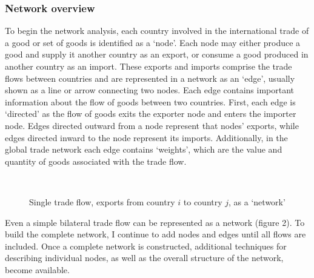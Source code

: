 \documentclass[10pt,letterpaper,pdftex]{article}
\begin{document}
\subsubsection{Network overview} \label{nw2}
To begin the network analysis, each country involved in the international trade of a good or set of goods is identified as a `node'. Each node may either produce a good and supply it another country as an export, or consume a good produced in another country as an import. These exports and imports comprise the trade flows between countries and are represented in a network as an `edge', usually shown as a line or arrow connecting two nodes. Each edge contains important information about the flow of goods between two countries. First, each edge is `directed' as the flow of goods exits the exporter node and enters the importer node. Edges directed outward from a node represent that nodes' exports, while edges directed inward to the node represent its imports. Additionally, in the global trade network each edge contains `weights', which are the value and quantity of goods associated with the trade flow.

\begin{figure}[!htb]\label{fig:nw_simple}
  \caption{Single trade flow, exports from country $i$ to country $j$, as a `network'}
  {\centering
{}\\}
\end{figure}

Even a simple bilateral trade flow can be represented as a network (figure 2). To build the complete network, I continue to add nodes and edges until all flows are included. Once a complete network is constructed, additional techniques for describing individual nodes, as well as the overall structure of the network, become available.
\end{document}

